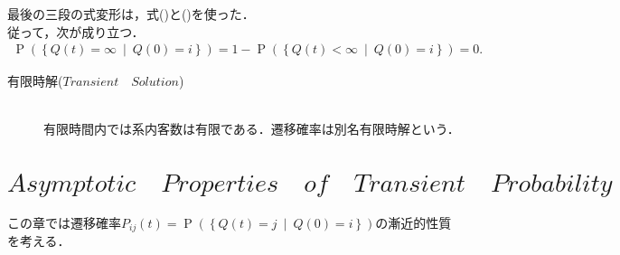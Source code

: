 \documentclass[a4j,papersize,disablejfam,slide,14pt]{jsarticle}
\def\cprob#1#2{\operatorname{P} \left(\left\{ #1 \ \middle|\ #2 \right\}\right)} %
\begin{document}
    最後の三段の式変形は，式()と()を使った．\\
    従って，次が成り立つ．
    \begin{align}
    	\cprob{Q(t) = \infty}{Q(0)=i} = 1 - \cprob{Q(t) < \infty}{Q(0)=i} = 0.
    \end{align}
    \begin{screen}
    	\begin{description}
    		\item[有限時解($Transient\quad Solution$)]\mbox{}\\
            	有限時間内では系内客数は有限である．遷移確率は別名有限時解という．
    	\end{description}
    \end{screen}

\section{$Asymptotic\quad Properties\quad of\quad Transient\quad Probability$}
	この章では遷移確率$P_{ij}(t) = \cprob{Q(t) = j}{Q(0)=i}$の漸近的性質を考える．
\end{document}
